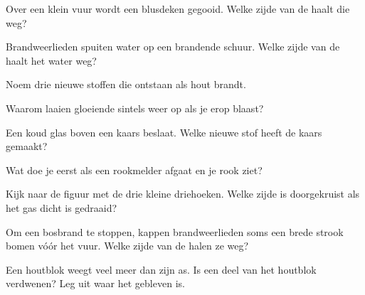 \begin{exercise}[$\star$]\label{exo:g4:what-a-fire-needs:3}
Over een klein vuur wordt een blusdeken gegooid. Welke zijde van de
 haalt die weg?
\end{exercise}

\begin{exercise}[$\star$]\label{exo:g4:what-a-fire-needs:4}
Brandweerlieden spuiten water op een brandende schuur. Welke zijde van de
 haalt het water weg?
\end{exercise}

\begin{exercise}[$\star$]\label{exo:g4:what-a-fire-needs:5}
Noem drie nieuwe stoffen die ontstaan als hout brandt.
\end{exercise}

\begin{exercise}[$\star$]\label{exo:g4:what-a-fire-needs:6}
Waarom laaien gloeiende sintels weer op als je erop blaast?
\end{exercise}

\begin{exercise}[$\star$]\label{exo:g4:what-a-fire-needs:7}
Een koud glas boven een kaars beslaat. Welke nieuwe stof heeft de kaars
gemaakt?
\end{exercise}

\begin{exercise}[$\star$]\label{exo:g4:what-a-fire-needs:8}
Wat doe je eerst als een rookmelder afgaat en je rook ziet?
\end{exercise}

\begin{exercise}[$\star$]\label{exo:g4:what-a-fire-needs:9}
Kijk naar de figuur met de drie kleine driehoeken. Welke zijde is
doorgekruist als het gas dicht is gedraaid?
\end{exercise}

\begin{exercise}[$\star\star$]\label{exo:g4:what-a-fire-needs:10}
Om een bosbrand te stoppen, kappen brandweerlieden soms een brede strook
bomen vóór het vuur. Welke zijde van de  halen ze weg?
\end{exercise}

\begin{exercise}[$\star\star$]\label{exo:g4:what-a-fire-needs:11}
Een houtblok weegt veel meer dan zijn as. Is een deel van het houtblok
verdwenen? Leg uit waar het gebleven is.
\end{exercise}
